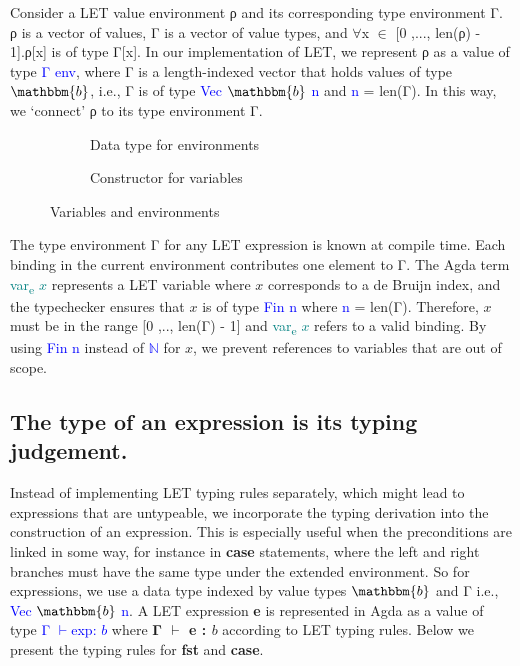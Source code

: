 \documentclass[12pt]{article}
\begin{document}
  Consider a LET value environment ρ and its corresponding type environment Γ. ρ is a vector of values, Γ is a vector of value types, and $\forall$x $\in$ [0 ,..., len(ρ) - 1].ρ[x] is of type Γ[x]. In our implementation of LET, we represent ρ as a value of type \textcolor{blue}{Γ env}, where Γ is a length-indexed vector that holds values of type \textcolor{blue}{$\mathbbm{b}$}, i.e., Γ is of type \textcolor{blue}{Vec $\mathbbm{b}$ n} and \textcolor{blue}{n} = len(Γ). In this way, we `connect' ρ to its type environment Γ.
  
  \begin{figure}[!htbp]
  	\begin{subfigure}[b]{0.6\textwidth}
  		\caption{Data type for environments}
  		\label{fig:f1}
  		
  	\end{subfigure}
  	\hfill \vline
  	\begin{subfigure}[b]{0.4\textwidth}
  		\caption{Constructor for variables}
  		\label{fig:f2}
  	\end{subfigure}
  	\hfill
  	\caption{Variables and environments}
  \end{figure}

	The type environment Γ for any LET expression is known at compile time. Each binding in the current environment contributes one element to Γ. The Agda term \textcolor{teal}{var\textsubscript{e} $x$} represents a LET variable where $x$ corresponds to a de Bruijn index, and the typechecker ensures that $x$ is of type \textcolor{blue}{Fin n} where \textcolor{blue}{n} = len(Γ). Therefore, $x$ must be in the range [0 ,.., len(Γ) - 1] and \textcolor{teal}{var\textsubscript{e} $x$} refers to a valid binding. By using \textcolor{blue}{Fin n} instead of \textcolor{blue}{$\mathbb{N}$} for $x$, we prevent references to variables that are out of scope.
	
	\subsection{The type of an expression is its typing judgement.}
	
	Instead of implementing LET typing rules separately, which might lead to expressions that are untypeable, we incorporate the typing derivation into the construction of an expression. This is especially useful when the preconditions are linked in some way, for instance in \textbf{case} statements, where the left and right branches must have the same type under the extended environment. So for expressions, we use a data type indexed by value types \textcolor{blue}{$\mathbbm{b}$} and Γ i.e., \textcolor{blue}{Vec $\mathbbm{b}$ n}. A LET expression \textbf{e} is represented in Agda as a value of type \textcolor{blue}{Γ $\vdash$exp: $b$} where \textbf{Γ $\vdash$ e : $b$} according to LET typing rules. Below we present the typing rules for \textbf{fst} and \textbf{case}.	
\end{document}

